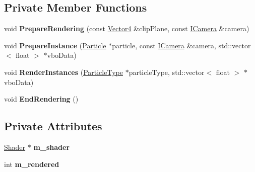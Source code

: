 \subsection*{Private Member Functions}
\begin{DoxyCompactItemize}
\item 
\mbox{\label{class_flounder_1_1_renderer_particles_af11b0e07fadc244d9271c004df9e6cfd}} 
void {\bfseries Prepare\+Rendering} (const \hyperlink{class_flounder_1_1_vector4}{Vector4} \&clip\+Plane, const \hyperlink{class_flounder_1_1_i_camera}{I\+Camera} \&camera)
\item 
\mbox{\label{class_flounder_1_1_renderer_particles_abbc956db88f14ed9f3d03c267bea68af}} 
void {\bfseries Prepare\+Instance} (\hyperlink{class_flounder_1_1_particle}{Particle} $\ast$particle, const \hyperlink{class_flounder_1_1_i_camera}{I\+Camera} \&camera, std\+::vector$<$ float $>$ $\ast$vbo\+Data)
\item 
\mbox{\label{class_flounder_1_1_renderer_particles_ac672f5f2cb1c2467ec97539a99ba0582}} 
void {\bfseries Render\+Instances} (\hyperlink{class_flounder_1_1_particle_type}{Particle\+Type} $\ast$particle\+Type, std\+::vector$<$ float $>$ $\ast$vbo\+Data)
\item 
\mbox{\label{class_flounder_1_1_renderer_particles_a2f135001fc131994970e98a45992dec0}} 
void {\bfseries End\+Rendering} ()
\end{DoxyCompactItemize}
\subsection*{Private Attributes}
\begin{DoxyCompactItemize}
\item 
\mbox{\label{class_flounder_1_1_renderer_particles_a913d42c7b5a4993c06264f445e080ffa}} 
\hyperlink{class_flounder_1_1_shader}{Shader} $\ast$ {\bfseries m\+\_\+shader}
\item 
\mbox{\label{class_flounder_1_1_renderer_particles_a15109ec44ec725b7807b6bc86b6f4a9b}} 
int {\bfseries m\+\_\+rendered}
\end{DoxyCompactItemize}
